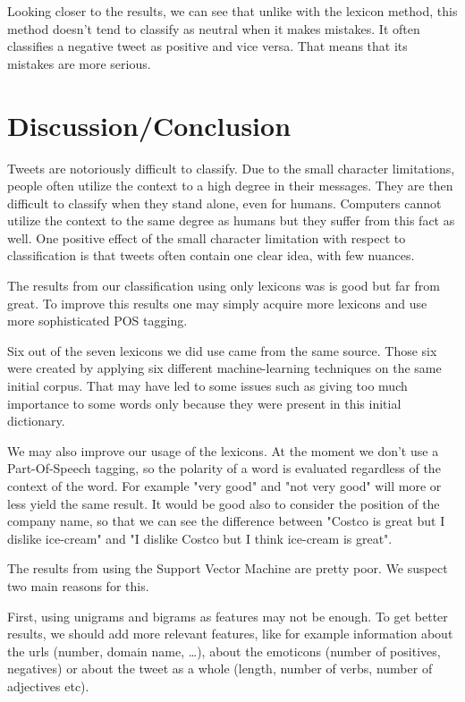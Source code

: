 \documentclass[a4paper,12pt]{report}
\begin{document}
Looking closer to the results, we can see that unlike with the lexicon method, this method doesn't tend to classify as neutral when it makes mistakes.
It often classifies a negative tweet as positive and vice versa.
That means that its mistakes are more serious.



\chapter{Discussion/Conclusion}

Tweets are notoriously difficult to classify. Due to the small character limitations, people often utilize the context to a high degree in their messages.
They are then difficult to classify when they stand alone, even for humans.
Computers cannot utilize the context to the same degree as humans but they suffer from this fact as well. One positive effect of the small character limitation with respect to classification is that tweets often contain one clear idea, with few nuances.

The results from our classification using only lexicons was is good but far from great. To improve this results one may simply acquire more lexicons and use more sophisticated POS tagging.

Six out of the seven lexicons we did use came from the same source. Those six were created by applying six different machine-learning techniques on the same initial corpus. That may have led to some issues such as giving too much importance to some words only because they were present in this initial dictionary.

We may also improve our usage of the lexicons. At the moment we don't use a Part-Of-Speech tagging, so the polarity of a word is evaluated regardless of the context of the word. For example "very good" and "not very good" will more or less yield the same result. It would be good also to consider the position of the company name, so that we can see the difference between "Costco is great but I dislike ice-cream" and "I dislike Costco but I think ice-cream is great".

The results from using the Support Vector Machine are pretty poor. We suspect two main reasons for this.

First, using unigrams and bigrams as features may not be enough. To get better results, we should add more relevant features, like for example information about the urls (number, domain name, …), about the emoticons (number of positives, negatives) or about the tweet as a whole (length, number of verbs, number of adjectives etc).
\end{document}
